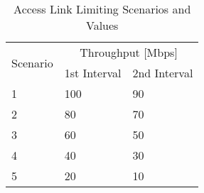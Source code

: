 \begin{table}[h!]
	\begin{center}
		\begin{tabular}{|| m{5em} | m{2cm}| m{2cm} ||}
			\hline
			\multirow{2}{*}{Scenario} & \multicolumn{2}{c||}{Throughput {[}Mbps{]}} \\ \cline{2-3} 
			& \multicolumn{1}{l|}{1st Interval} & \multicolumn{1}{l||}{2nd Interval} \\ \hline\hline
			1 & 100 & 90 \\ \hline
			2 & 80 & 70 \\ \hline
			3 & 60 & 50 \\ \hline
			4 & 40 & 30 \\ \hline
			5 & 20 & 10 \\ \hline
		\end{tabular}
	\end{center}
	\caption{Access Link Limiting Scenarios and Values}
	\label{table:Access_Link_Experiment_Values}
\end{table}

